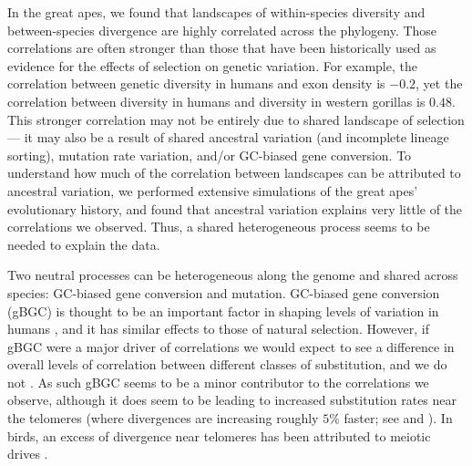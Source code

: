 In the great apes, we found that landscapes of within-species diversity and between-species divergence are 
highly correlated across the phylogeny.
Those correlations are often stronger than those that have been historically used as evidence for the effects of selection on genetic variation.
For example, the correlation between genetic diversity in humans and exon density is $-0.2$, 
yet the correlation between diversity in humans and diversity in western gorillas is $0.48$.
This stronger correlation may not be entirely due to shared landscape of selection --- it may also be a result of shared ancestral variation (and incomplete lineage sorting), mutation rate variation,
and/or GC-biased gene conversion.
To understand how much of the correlation between landscapes can be attributed to ancestral variation,
we performed extensive simulations of the great apes' evolutionary history,
and found that ancestral variation explains very little of the correlations we observed.
Thus, a shared heterogeneous process seems to be needed to explain the data.

Two neutral processes can be heterogeneous along the genome and shared across species:
GC-biased gene conversion and mutation.
GC-biased gene conversion (gBGC) is thought to be an important factor in shaping levels of variation in humans \citep{chen_gene_2007, pouyet_background_2018, glemin_quantification_2015},
and it has similar effects to those of natural selection.
However, if gBGC were a major driver of correlations we would expect to see a difference in overall levels
of correlation between different classes of substitution, and we do not .
As such gBGC seems to be a minor contributor to the correlations we observe,
although it does seem to be leading to increased substitution rates
near the telomeres
(where divergences are increasing roughly $5\%$ faster; see  and ).
In birds,  an excess of divergence near telomeres has been attributed to meiotic drives \citep{ellegren_genomic_2012}.

